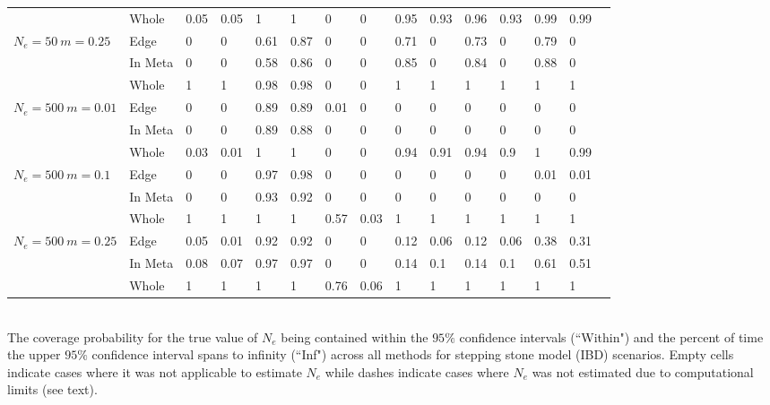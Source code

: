 \begin{landscape}
\begin{table}[h]
\begin{tabular}{ | l| l|| l| l| l| l| l| l| l| l| l| l| l| l| l| l| l| l| }
  & Whole & 0.05 & 0.05 & 1 & 1 & 0 & 0 & 0.95 & 0.93 & 0.96 & 0.93 & 0.99 & 0.99 &  \multicolumn{4}{l}{}  \\ \cline{1-14}
\multirow{3}{1cm}{$N_e = 50 ~ m = 0.25$} & Edge & 0 & 0 & 0.61 & 0.87 & 0 & 0 & 0.71 & 0 & 0.73 & 0 & 0.79 & 0 &  \multicolumn{4}{l}{}  \\ \cline{2-14}
  & In Meta & 0 & 0 & 0.58 & 0.86 & 0 & 0 & 0.85 & 0 & 0.84 & 0 & 0.88 & 0 &  \multicolumn{4}{l}{}  \\ \cline{2-14}
  & Whole & 1 & 1 & 0.98 & 0.98 & 0 & 0 & 1 & 1 & 1 & 1 & 1 & 1 &  \multicolumn{4}{l}{}  \\ \cline{1-14}
\multirow{3}{1cm}{$N_e = 500 ~ m = 0.01$} & Edge & 0 & 0 & 0.89 & 0.89 & 0.01 & 0 & 0 & 0 & 0 & 0 & 0 & 0 &  \multicolumn{4}{l}{}  \\ \cline{2-14}
  & In Meta & 0 & 0 & 0.89 & 0.88 & 0 & 0 & 0 & 0 & 0 & 0 & 0 & 0 &  \multicolumn{4}{l}{}  \\ \cline{2-14}
  & Whole & 0.03 & 0.01 & 1 & 1 & 0 & 0 & 0.94 & 0.91 & 0.94 & 0.9 & 1 & 0.99  & \multicolumn{4}{l}{}  \\ \cline{1-14}
\multirow{3}{1cm}{$N_e = 500 ~ m = 0.1$} & Edge & 0 & 0 & 0.97 & 0.98 & 0 & 0 & 0 & 0 & 0 & 0 & 0.01 & 0.01 &  \multicolumn{4}{l}{}  \\ \cline{2-14}
  & In Meta & 0 & 0 & 0.93 & 0.92 & 0 & 0 & 0 & 0 & 0 & 0 & 0 & 0 &  \multicolumn{4}{l}{}  \\ \cline{2-14}
  & Whole & 1 & 1 & 1 & 1 & 0.57 & 0.03 & 1 & 1 & 1 & 1 & 1 & 1 &  \multicolumn{4}{l}{}  \\ \cline{1-14}
\multirow{3}{1cm}{$N_e = 500 ~ m = 0.25$} & Edge & 0.05 & 0.01 & 0.92 & 0.92 & 0 & 0 & 0.12 & 0.06 & 0.12 & 0.06 & 0.38 & 0.31 &  \multicolumn{4}{l}{}  \\ \cline{2-14}
  & In Meta & 0.08 & 0.07 & 0.97 & 0.97 & 0 & 0 & 0.14 & 0.1 & 0.14 & 0.1 & 0.61 & 0.51 &  \multicolumn{4}{l}{}  \\ \cline{2-14}
  & Whole & 1 & 1 & 1 & 1 & 0.76 & 0.06 & 1 & 1 & 1 & 1 & 1 & 1 &  \multicolumn{4}{l}{}  \\ \cline{1-14}
\end{tabular}
\bigskip{}
{\footnotesize \\ The coverage probability for the true value of $N_e$ being contained within the $95\%$ confidence intervals (``Within") and the percent of time the upper $95\%$ confidence interval spans to infinity (``Inf") across all methods for stepping stone model (IBD) scenarios. Empty cells indicate cases where it was not applicable to estimate $N_e$ while dashes indicate cases where $N_e$ was not estimated due to computational limits (see text).}
\end{table}

\end{landscape}




